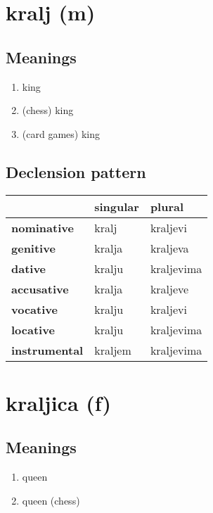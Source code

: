 \filbreak
\section{kralj (m)}
\subsection*{Meanings}
\begin{enumerate}
\item king
\item (chess) king
\item (card games) king
\end{enumerate}
\subsection*{Declension pattern}
\begin{tabularx}{\linewidth}{Xll}
\toprule
{} & singular &      plural \\
\midrule
\textbf{nominative  } &    kralj &    kraljevi \\
\textbf{genitive    } &   kralja &    kraljeva \\
\textbf{dative      } &   kralju &  kraljevima \\
\textbf{accusative  } &   kralja &    kraljeve \\
\textbf{vocative    } &   kralju &    kraljevi \\
\textbf{locative    } &   kralju &  kraljevima \\
\textbf{instrumental} &  kraljem &  kraljevima \\
\bottomrule
\end{tabularx}

\filbreak
\section{kraljica (f)}
\subsection*{Meanings}
\begin{enumerate}
\item queen
\item queen (chess)
\end{enumerate}
